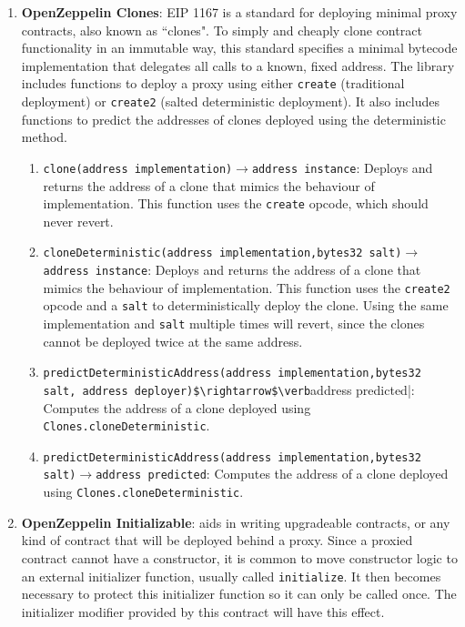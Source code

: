 \begin{enumerate}
\item\textbf{OpenZeppelin Clones}: EIP 1167 is a standard for deploying minimal proxy contracts, also known as “clones". To simply and cheaply clone contract functionality in an immutable way, this standard specifies a minimal bytecode implementation that delegates all calls to a known, fixed address. The library includes functions to deploy a proxy using either \verb|create| (traditional deployment) or \verb|create2| (salted deterministic deployment). It also includes functions to predict the addresses of clones deployed using the deterministic method.
	\begin{enumerate}
	\item\verb|clone(address implementation)|$\rightarrow$\verb|address instance|: Deploys and returns the address of a clone that mimics the behaviour of implementation. This function uses the \verb|create| opcode, which should never revert.
	\item\verb|cloneDeterministic(address implementation,|\linebreak\verb|bytes32 salt)|$\rightarrow$\verb|address instance|: Deploys and returns the address of a clone that mimics the behaviour of implementation. This function uses the \verb|create2| opcode and a \verb|salt| to deterministically deploy the clone. Using the same implementation and \verb|salt| multiple times will revert, since the clones cannot be deployed twice at the same address.
	\item\verb|predictDeterministicAddress(address implementation,|\linebreak\verb|bytes32 salt, address deployer)$\rightarrow$\verb|address predicted|: Computes the address of a clone deployed using \verb|Clones.cloneDeterministic|.
	\item\verb|predictDeterministicAddress(address implementation,|\linebreak\verb|bytes32 salt)|$\rightarrow$\verb|address predicted|: Computes the address of a clone deployed using \verb|Clones.cloneDeterministic|.
	\end{enumerate}

\item\textbf{OpenZeppelin Initializable}: aids in writing upgradeable contracts, or any kind of contract that will be deployed behind a proxy. Since a proxied contract cannot have a constructor, it is common to move constructor logic to an external initializer function, usually called \verb|initialize|. It then becomes necessary to protect this initializer function so it can only be called once. The initializer modifier provided by this contract will have this effect.\\


\end{enumerate}
